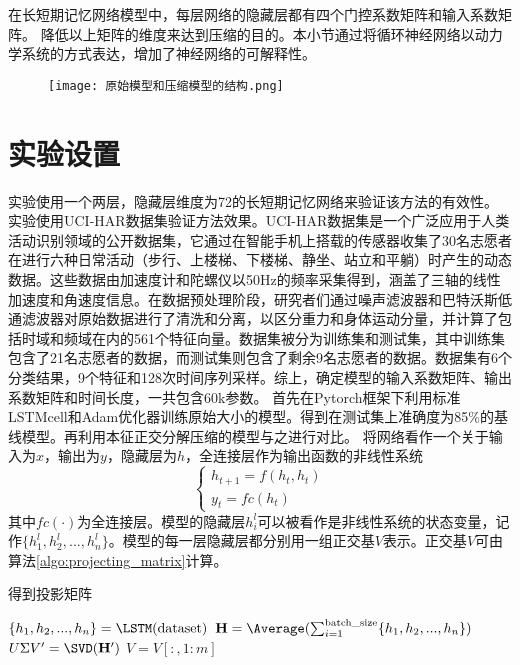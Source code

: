 在长短期记忆网络模型中，每层网络的隐藏层都有四个门控系数矩阵和输入系数矩阵。
降低以上矩阵的维度来达到压缩的目的。本小节通过将循环神经网络以动力学系统的方式表达，增加了神经网络的可解释性。

\begin{figure}[!htbp]
  \centering
  \texttt{[image: 原始模型和压缩模型的结构.png]}
  \label{fig:原始模型和压缩模型的结构}
\end{figure}
\section{实验设置}
实验使用一个两层，隐藏层维度为72的长短期记忆网络来验证该方法的有效性。
实验使用UCI-HAR数据集\cite{anguita2012human}验证方法效果。UCI-HAR数据集是一个广泛应用于人类活动识别领域的公开数据集，它通过在智能手机上搭载的传感器收集了30名志愿者在进行六种日常活动（步行、上楼梯、下楼梯、静坐、站立和平躺）时产生的动态数据。这些数据由加速度计和陀螺仪以50Hz的频率采集得到，涵盖了三轴的线性加速度和角速度信息。在数据预处理阶段，研究者们通过噪声滤波器和巴特沃斯低通滤波器对原始数据进行了清洗和分离，以区分重力和身体运动分量，并计算了包括时域和频域在内的561个特征向量。数据集被分为训练集和测试集，其中训练集包含了21名志愿者的数据，而测试集则包含了剩余9名志愿者的数据。数据集有6个分类结果，9个特征和128次时间序列采样。综上，确定模型的输入系数矩阵、输出系数矩阵和时间长度，一共包含60k参数。
首先在Pytorch框架下利用标准LSTMcell和Adam优化器训练原始大小的模型。得到在测试集上准确度为85\%的基线模型。再利用本征正交分解压缩的模型与之进行对比。
将网络看作一个关于输入为$x$，输出为$y$，隐藏层为$h$，全连接层作为输出函数的非线性系统
\begin{equation}
  \label{eq:22}
\left\{ \begin{array}{l}
  {h_{t + 1}} = f({h_t},{h_t})\\
  {y_t} = fc({h_t})
  \end{array} \right.
\end{equation}
其中$fc( \cdot )$为全连接层。模型的隐藏层$h_i^l$可以被看作是非线性系统的状态变量，记作$\{ h_1^l,h_2^l,...,h_n^l\}$。模型的每一层隐藏层都分别用一组正交基$V$表示。正交基$V$可由算法\ref{algo:projecting_matrix}计算。
\begin{algorithm}[!htbp]
  \caption{得到投影矩阵}
  \label{algo:projecting_matrix}
  \DontPrintSemicolon
  
  
  \vspace{5pt}
  
  $\{h_1, h_2, ..., h_n\} = \LSTM(\text{dataset})$\;
  $\mathbf{H} = \Average(\sum_{i=1}^{\text{batch\_size}} \{h_1, h_2, ..., h_n\})$\;
  $U \Sigma V' = \SVD(\mathbf{H}')$\;
  $V = V[:, 1:m]$\;
  
\end{algorithm}

